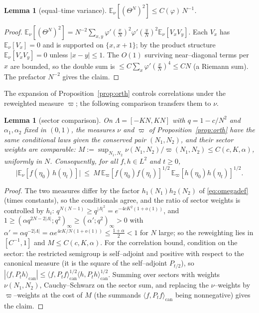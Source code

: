 \documentclass[11pt]{article}
\theoremstyle{plain}
\newtheorem{lemma}[theorem]{Lemma}
\theoremstyle{definition}
\theoremstyle{remark}
\newcommand{\E}{\mathbb{E}}\newcommand{\PP}{\mathbb{P}}\newcommand{\dd}{\,\mathrm{d}}
\begin{document}
\begin{lemma}[equal--time variance]\label{lem:eqvar}
$\E_\nu[(\Theta^N)^2]\le C(\varphi)\,N^{-1}$.
\end{lemma}
\begin{proof}
$\E_\nu[(\Theta^N)^2]=N^{-2}\sum_{x,y}\varphi'(\tfrac xN)^2\varphi'(\tfrac yN)^2\E_\nu[V_xV_y]$.
Each $V_x$ has $\E_\nu[V_x]=0$ and is supported on $\{x,x+1\}$; by the product structure
$\E_\nu[V_xV_y]=0$ unless $|x-y|\le1$. The $O(1)$ surviving near--diagonal terms per $x$
are bounded, so the double sum is $\le C\sum_x\varphi'(\tfrac xN)^4\le CN$ (a Riemann
sum). The prefactor $N^{-2}$ gives the claim.
\end{proof}

The expansion of Proposition~\ref{prop:orth} controls correlations under the
reweighted measure $\varpi$; the following comparison transfers them to $\nu$.

\begin{lemma}[sector comparison]\label{lem:sector}
On $\Lambda=[-KN,KN]$ with $q=1-c/N^2$ and $\alpha_1,\alpha_2$ fixed in $(0,1)$, the
measures $\nu$ and $\varpi$ of Proposition~\ref{prop:orth} have the same conditional
laws given the conserved pair $(N_1,N_2)$, and their sector weights are comparable:
$M:=\sup_{N_1,N_2}\nu(N_1,N_2)/\varpi(N_1,N_2)\le C(c,K,\alpha)$, uniformly in $N$.
Consequently, for all $f,h\in L^2$ and $t\ge0$,
\[
  \big|\E_\nu[f(\eta_0)\,h(\eta_t)]\big|\ \le\ M\,
  \E_\varpi[f(\eta_0)f(\eta_t)]^{1/2}\,\E_\varpi[h(\eta_0)h(\eta_t)]^{1/2}.
\]
\end{lemma}
\begin{proof}
The two measures differ by the factor $h_1(N_1)h_2(N_2)$ of \eqref{eq:omegadef}
(times constants), so the conditionals agree, and the ratio of sector weights is
controlled by $h_i$: $q^{N(N-1)}\ge q^{|\Lambda|^2}=e^{-4cK^2(1+o(1))}$, and
$1\ge(\alpha q^{2N-2|\Lambda|};q^2)_\infty\ge(\alpha';q^2)_\infty>0$ with
$\alpha'=\alpha q^{-2|\Lambda|}=\alpha e^{4cK/N(1+o(1))}\le\tfrac{1+\alpha}2<1$ for
$N$ large; so the reweighting lies in $[C^{-1},1]$ and $M\le C(c,K,\alpha)$. For the
correlation bound, condition on the sector: the restricted semigroup is
self--adjoint and positive with respect to the canonical measure (it is the square
of the self--adjoint $P_{t/2}$), so
$|\langle f,P_th\rangle_{\mathrm{can}}|\le
\langle f,P_tf\rangle_{\mathrm{can}}^{1/2}\langle h,P_th\rangle_{\mathrm{can}}^{1/2}$.
Summing over sectors with weights $\nu(N_1,N_2)$, Cauchy--Schwarz on the sector sum,
and replacing the $\nu$--weights by $\varpi$--weights at the cost of $M$ (the
summands $\langle f,P_tf\rangle_{\mathrm{can}}$ being nonnegative) gives the claim.
\end{proof}
\end{document}
